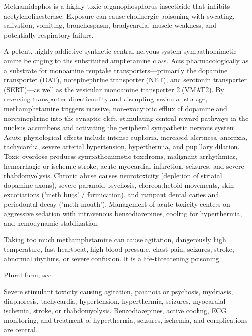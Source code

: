  Methamidophos is a highly toxic organophosphorus insecticide that inhibits acetylcholinesterase. Exposure can cause cholinergic poisoning with sweating, salivation, vomiting, bronchospasm, bradycardia, muscle weakness, and potentially respiratory failure.

 A potent, highly addictive synthetic central nervous system sympathomimetic amine belonging to the substituted amphetamine class. Acts pharmacologically as a substrate for monoamine reuptake transporters—primarily the dopamine transporter (DAT), norepinephrine transporter (NET), and serotonin transporter (SERT)—as well as the vesicular monoamine transporter 2 (VMAT2). By reversing transporter directionality and disrupting vesicular storage, methamphetamine triggers massive, non-exocytotic efflux of dopamine and norepinephrine into the synaptic cleft, stimulating central reward pathways in the nucleus accumbens and activating the peripheral sympathetic nervous system. Acute physiological effects include intense euphoria, increased alertness, anorexia, tachycardia, severe arterial hypertension, hyperthermia, and pupillary dilation. Toxic overdose produces sympathomimetic toxidrome, malignant arrhythmias, hemorrhagic or ischemic stroke, acute myocardial infarction, seizures, and severe rhabdomyolysis. Chronic abuse causes neurotoxicity (depletion of striatal dopamine axons), severe paranoid psychosis, choreoathetoid movements, skin excoriations ('meth bugs' / formication), and rampant dental caries and periodontal decay ('meth mouth'). Management of acute toxicity centers on aggressive sedation with intravenous benzodiazepines, cooling for hyperthermia, and hemodynamic stabilization.

 Taking too much methamphetamine can cause agitation, dangerously high temperature, fast heartbeat, high blood pressure, chest pain, seizures, stroke, abnormal rhythms, or severe confusion. It is a life-threatening poisoning.

 Plural form; see .

 Severe stimulant toxicity causing agitation, paranoia or psychosis, mydriasis, diaphoresis, tachycardia, hypertension, hyperthermia, seizures, myocardial ischemia, stroke, or rhabdomyolysis. Benzodiazepines, active cooling, ECG monitoring, and treatment of hyperthermia, seizures, ischemia, and complications are central.

